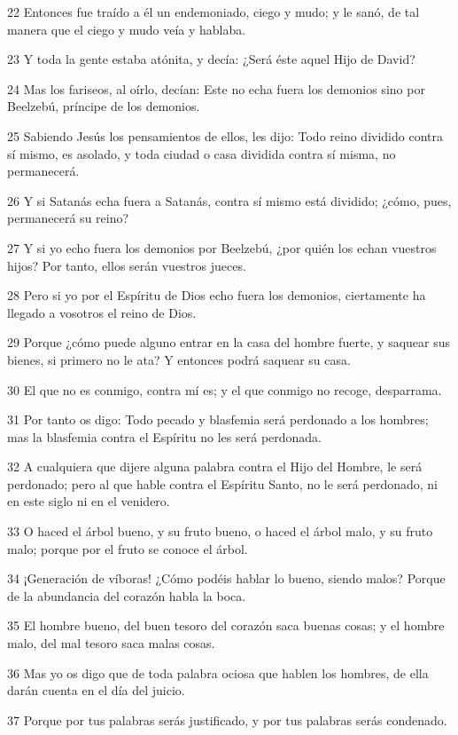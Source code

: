 \par 22 Entonces fue traído a él un endemoniado, ciego y mudo; y le sanó, de tal manera que el ciego y mudo veía y hablaba.
\par 23 Y toda la gente estaba atónita, y decía: ¿Será éste aquel Hijo de David?
\par 24 Mas los fariseos, al oírlo, decían: Este no echa fuera los demonios sino por Beelzebú, príncipe de los demonios.
\par 25 Sabiendo Jesús los pensamientos de ellos, les dijo: Todo reino dividido contra sí mismo, es asolado, y toda ciudad o casa dividida contra sí misma, no permanecerá.
\par 26 Y si Satanás echa fuera a Satanás, contra sí mismo está dividido; ¿cómo, pues, permanecerá su reino?
\par 27 Y si yo echo fuera los demonios por Beelzebú, ¿por quién los echan vuestros hijos? Por tanto, ellos serán vuestros jueces.
\par 28 Pero si yo por el Espíritu de Dios echo fuera los demonios, ciertamente ha llegado a vosotros el reino de Dios.
\par 29 Porque ¿cómo puede alguno entrar en la casa del hombre fuerte, y saquear sus bienes, si primero no le ata? Y entonces podrá saquear su casa.
\par 30 El que no es conmigo, contra mí es; y el que conmigo no recoge, desparrama.
\par 31 Por tanto os digo: Todo pecado y blasfemia será perdonado a los hombres; mas la blasfemia contra el Espíritu no les será perdonada.
\par 32 A cualquiera que dijere alguna palabra contra el Hijo del Hombre, le será perdonado; pero al que hable contra el Espíritu Santo, no le será perdonado, ni en este siglo ni en el venidero.
\par 33 O haced el árbol bueno, y su fruto bueno, o haced el árbol malo, y su fruto malo; porque por el fruto se conoce el árbol.
\par 34 ¡Generación de víboras! ¿Cómo podéis hablar lo bueno, siendo malos? Porque de la abundancia del corazón habla la boca.
\par 35 El hombre bueno, del buen tesoro del corazón saca buenas cosas; y el hombre malo, del mal tesoro saca malas cosas.
\par 36 Mas yo os digo que de toda palabra ociosa que hablen los hombres, de ella darán cuenta en el día del juicio.
\par 37 Porque por tus palabras serás justificado, y por tus palabras serás condenado.

